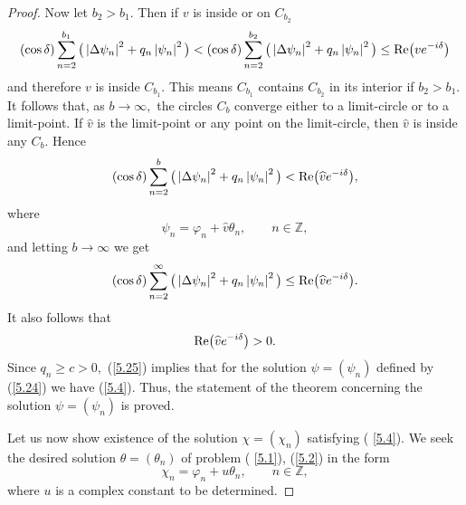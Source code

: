 \documentclass[pdftex]{sigma}
\numberwithin{equation}{section}
\begin{document}
\begin{proof}
Now let $b_{2}>b_{1}.$ Then if $v$ is inside or on $C_{b_{2}}$%
\[
(\cos \delta )\sum_{n=2}^{b_{1}}\big( \left\vert \Delta \psi
_{n}\right\vert ^{2}+q_{n}\left\vert \psi _{n}\right\vert ^{2}\big) <(\cos
\delta )\sum_{n=2}^{b_{2}}\big( \left\vert \Delta \psi _{n}\right\vert
^{2}+q_{n}\left\vert \psi _{n}\right\vert ^{2}\big) \leq {\rm Re}
\big(ve^{-i\delta }\big)
\]%
and therefore $v$ is inside $C_{b_{1}}.$ This means $C_{b_{1}}$ contains $%
C_{b_{2}}$ in its interior if $b_{2}>b_{1}.$ It follows that, as $%
b\rightarrow \infty ,$ the circles $C_{b}$ converge either to a limit-circle
or to a limit-point. If $\widehat{v}$ is the limit-point or any point on the
limit-circle, then $\widehat{v}$ is inside any $C_{b}.$ Hence%
\[
(\cos \delta )\sum_{n=2}^{b}\big( \left\vert \Delta \psi _{n}\right\vert
^{2}+q_{n}\left\vert \psi _{n}\right\vert ^{2}\big) <{\rm Re}\big(\widehat{v}%
e^{-i\delta }\big),
\]%
where%
\begin{equation}
\psi _{n}=\varphi _{n}+\widehat{v}\theta _{n},\qquad n\in
\mathbb{Z}
,  \label{5.24}
\end{equation}%
and letting $b\rightarrow \infty $ we get%
\begin{equation}
(\cos \delta )\sum_{n=2}^{\infty }\big( \left\vert \Delta \psi
_{n}\right\vert ^{2}+q_{n}\left\vert \psi _{n}\right\vert ^{2}\big) \leq
{\rm Re}\big(\widehat{v}e^{-i\delta }\big).  \label{5.25}
\end{equation}%
It also follows that%
\begin{equation}
{\rm Re}\big(\widehat{v}e^{-i\delta }\big)>0.  \label{5.26}
\end{equation}%
Since $q_{n}\geq c>0,$ (\ref{5.25}) implies that for the solution $\psi
=(\psi _{n})$ def\/ined by (\ref{5.24}) we have (\ref{5.4}). Thus, the
statement of the theorem concerning the solution $\psi =(\psi _{n})$ is
proved.

Let us now show existence of the solution $\chi =(\chi _{n})$ satisfying (%
\ref{5.4}). We seek the desired solution $\theta =(\theta _{n})$ of problem (%
\ref{5.1}), (\ref{5.2}) in the form%
\[
\chi _{n}=\varphi _{n}+u\theta _{n},\qquad n\in
\mathbb{Z}
,
\]
where $u$ is a complex constant to be determined.


\end{proof}
\end{document}
